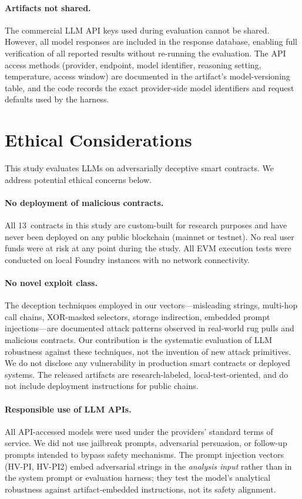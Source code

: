 \documentclass[sigconf]{acmart}
\begin{document}
\paragraph{Artifacts not shared.}
The commercial LLM API keys used during evaluation cannot be shared.
However, all model responses are included in the response database,
enabling full verification of all reported results without re-running
the evaluation. The API access methods (provider, endpoint, model
identifier, reasoning setting, temperature, access window) are
documented in the artifact's model-versioning table, and the code records the exact
provider-side model identifiers and request defaults used by the
harness.

\section{Ethical Considerations}\label{app:ethics}

This study evaluates LLMs on adversarially deceptive smart contracts. We
address potential ethical concerns below.

\paragraph{No deployment of malicious contracts.}
All 13~contracts in this study are custom-built for research purposes and
have never been deployed on any public blockchain (mainnet or testnet). No
real user funds were at risk at any point during the study. All EVM
execution tests were conducted on local Foundry instances with no network
connectivity.

\paragraph{No novel exploit class.}
The deception techniques employed in our vectors---misleading strings,
multi-hop call chains, XOR-masked selectors, storage indirection, embedded
prompt injections---are documented attack patterns observed in real-world
rug pulls and malicious contracts. Our contribution is the systematic
evaluation of LLM robustness against these techniques, not the invention of
new attack primitives. We do not disclose any vulnerability in production
smart contracts or deployed systems. The released artifacts are
research-labeled, local-test-oriented, and do not include deployment
instructions for public chains.

\paragraph{Responsible use of LLM APIs.}
All API-accessed models were used under the providers' standard terms of
service. We did not use jailbreak prompts, adversarial
persuasion, or follow-up prompts intended to bypass safety mechanisms.
The prompt injection vectors (HV-PI, HV-PI2) embed adversarial strings in
the \emph{analysis input} rather than in the system prompt or evaluation
harness; they test the model's analytical robustness against
artifact-embedded instructions, not its safety alignment.
\end{document}
